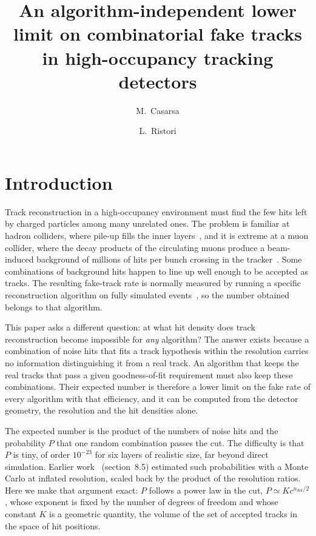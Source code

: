 \IfFileExists{jinst.cls}{\documentclass[a4paper,11pt]{jinst}}
\title{An algorithm-independent lower limit on combinatorial fake tracks in high-occupancy tracking detectors}
\author[a]{M.~Casarsa}
\author[b,1]{L.~Ristori\note{Corresponding author.}}
\affiliation[a]{INFN, Sezione di Trieste, Trieste, Italy}
\affiliation[b]{Fermi National Accelerator Laboratory, Batavia, IL 60510, USA}
\newcommand{\ndof}{n_\mathrm{dof}}
\begin{document}
\flushbottom
\maketitle

\section{Introduction}\label{sec:intro}

Track reconstruction in a high-occupancy environment must find the few hits left by charged
particles among many unrelated ones. The problem is familiar at hadron colliders, where
pile-up fills the inner layers~\cite{CMS:2014tracking,ATLAS:2017dense}, and it is extreme at
a muon collider, where the decay products of the circulating muons produce a beam-induced
background of millions of hits per bunch crossing in the
tracker~\cite{Accettura:2023,IMCC:2024interim,Casarsa:2024review,Bartosik:2020,Collamati:2021}.
Some combinations of background hits happen to line up well enough to be accepted as tracks.
The resulting fake-track rate is normally measured by running a specific reconstruction
algorithm on fully simulated events~\cite{Mankel:2004,Strandlie:2010,Fruhwirth:2021book}, so
the number obtained belongs to that algorithm.

This paper asks a different question: at what hit density does track reconstruction become
impossible for \emph{any} algorithm? The answer exists because a combination of noise hits
that fits a track hypothesis within the resolution carries no information distinguishing it
from a real track. An algorithm that keeps the real tracks that pass a given goodness-of-fit
requirement must also keep these combinations. Their expected number is therefore a lower
limit on the fake rate of every algorithm with that efficiency, and it can be computed from
the detector geometry, the resolution and the hit densities alone.

The expected number is the product of the numbers of noise hits and the probability $P$
that one random combination passes the cut. The difficulty is that $P$ is tiny, of order
$10^{-23}$ for six layers of realistic size, far beyond direct simulation. Earlier
work~\cite{Casarsa:2025jinst} (section~8.5) estimated such probabilities with a Monte Carlo at
inflated resolution, scaled back by the product of the resolution ratios. Here we make that
argument exact: $P$ follows a power law in the cut, $P\simeq Kc^{\ndof/2}$, whose exponent is
fixed by the number of degrees of freedom and whose constant $K$ is a geometric quantity, the
volume of the set of accepted tracks in the space of hit positions.
\end{document}
